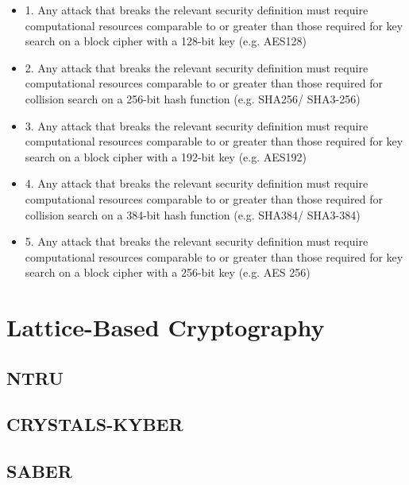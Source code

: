 \begin{itemize}
    \item 1. Any attack that breaks the relevant security definition must require computational resources comparable to or greater than those required for key search on a block cipher with a 128-bit key (e.g. AES128)
    \item 2. Any attack that breaks the relevant security definition must require computational resources comparable to or greater than those required for collision search on a 256-bit hash function (e.g. SHA256/ SHA3-256)
    \item 3. Any attack that breaks the relevant security definition must require computational resources comparable to or greater than those required for key search on a block cipher with a 192-bit key (e.g. AES192)
    \item 4. Any attack that breaks the relevant security definition must require computational resources comparable to or greater than those required for collision search on a 384-bit hash function (e.g. SHA384/ SHA3-384)
    \item 5. Any attack that breaks the relevant security definition must require computational resources comparable to or greater than those required for key search on a block cipher with a 256-bit key (e.g. AES 256)
\end{itemize}

\section{Lattice-Based Cryptography}


\subsection{NTRU}


\subsection{CRYSTALS-KYBER}


\subsection{SABER}

